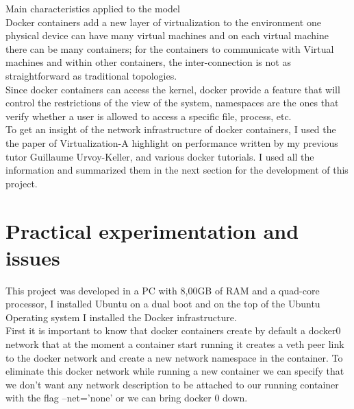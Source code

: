 Main characteristics applied to the model\\

Docker containers add a new layer of virtualization to the environment one physical device can have many virtual machines and on each virtual machine there can be many containers; for the containers to communicate with Virtual machines and within other containers, the inter-connection is not as straightforward as traditional topologies.\\

Since docker containers can access the kernel, docker provide a feature that will control the restrictions of the view of the system, namespaces are the ones that verify whether a user is allowed to access a specific file, process, etc.\\

To get an insight of the network infrastructure of docker containers, I used the the paper of Virtualization-A highlight on performance \cite{3} written by my previous tutor Guillaume Urvoy-Keller, and various docker tutorials\cite{4}. I used all the information and summarized them in the next section for the development of this project.\\

\section{Practical experimentation and issues}

This project was developed in a PC with 8,00GB of RAM and a quad-core processor, I installed Ubuntu on a dual boot and on the top of the Ubuntu Operating system I installed the Docker infrastructure.\\

First it is important to know that docker containers create by default a docker0 network that at the moment a container start running it creates a veth peer link to the docker network and create a new network namespace in the container. To  eliminate this docker network while running a new container we can specify that we don’t want any network description to be attached to our running container with the flag –net=’none’   or we can  bring docker 0 down.\\

